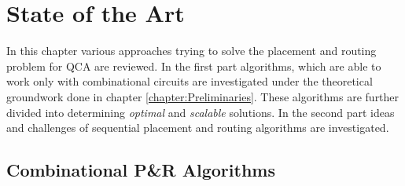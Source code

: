 \chapter{State of the Art}\label{chapter:SotA}
In this chapter various approaches trying to solve the placement and routing problem for QCA are reviewed. In the first part algorithms, which are able to work only with combinational circuits are investigated under the theoretical groundwork done in chapter \ref{chapter:Preliminaries}. These algorithms are further divided into determining \textit{optimal} and \textit{scalable} solutions. In the second part ideas and challenges of sequential placement and routing algorithms are investigated.

\section{Combinational P\&R Algorithms}
